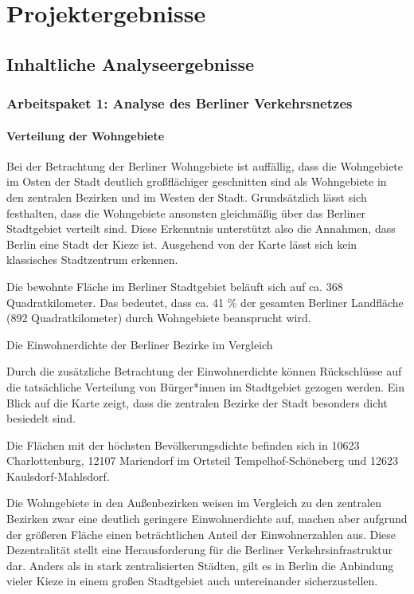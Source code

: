 \newpage
\section{Projektergebnisse} \label{infos}

\subsection{Inhaltliche Analyseergebnisse}

\subsubsection{Arbeitspaket 1: Analyse des Berliner Verkehrsnetzes}

\paragraph{Verteilung der Wohngebiete}

Bei der Betrachtung der Berliner Wohngebiete ist auffällig, dass die Wohngebiete im Osten der Stadt deutlich großflächiger geschnitten sind als Wohngebiete in den zentralen Bezirken und im Westen der Stadt. Grundsätzlich lässt sich festhalten, dass die Wohngebiete ansonsten gleichmäßig über das Berliner Stadtgebiet verteilt sind. Diese Erkenntnis unterstützt also die Annahmen, dass Berlin eine Stadt der Kieze ist. Ausgehend von der Karte lässt sich kein klassisches Stadtzentrum erkennen.

Die bewohnte Fläche im Berliner Stadtgebiet beläuft sich auf ca. 368 Quadratkilometer. Das bedeutet, dass ca. 41 \% der gesamten Berliner Landfläche (892 Quadratkilometer) durch Wohngebiete beansprucht wird.

Die Einwohnerdichte der Berliner Bezirke im Vergleich

Durch die zusätzliche Betrachtung der Einwohnerdichte können Rückschlüsse auf die tatsächliche Verteilung von Bürger*innen im Stadtgebiet gezogen werden. Ein Blick auf die Karte zeigt, dass die zentralen Bezirke der Stadt besonders dicht besiedelt sind.

Die Flächen mit der höchsten Bevölkerungsdichte befinden sich in 10623 Charlottenburg, 12107 Mariendorf im Ortsteil Tempelhof-Schöneberg und 12623 Kaulsdorf-Mahlsdorf.

Die Wohngebiete in den Außenbezirken weisen im Vergleich zu den zentralen Bezirken zwar eine deutlich geringere Einwohnerdichte auf, machen aber aufgrund der größeren Fläche einen beträchtlichen Anteil der Einwohnerzahlen aus. Diese Dezentralität stellt eine Herausforderung für die Berliner Verkehrsinfrastruktur dar. Anders als in stark zentralisierten Städten, gilt es in Berlin die Anbindung vieler Kieze in einem großen Stadtgebiet auch untereinander sicherzustellen.



